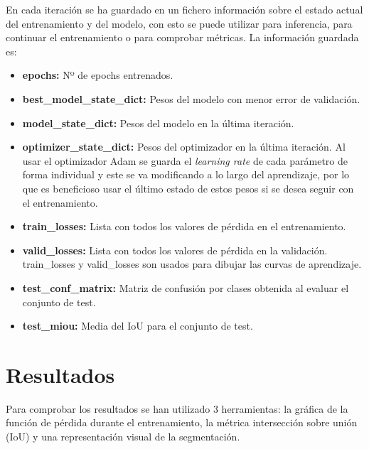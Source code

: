 En cada iteración se ha guardado en un fichero información sobre el estado actual del entrenamiento y del modelo, con esto se puede utilizar para inferencia, para continuar el entrenamiento o para comprobar métricas. La información guardada es:

\begin{itemize}
\item \textbf{epochs:} Nº de epochs entrenados.
\item \textbf{best\_model\_state\_dict:} Pesos del modelo con menor error de validación.
\item \textbf{model\_state\_dict:} Pesos del modelo en la última iteración.
\item \textbf{optimizer\_state\_dict:} Pesos del optimizador en la última iteración. Al usar el optimizador Adam se guarda el \textit{learning rate} de cada parámetro de forma individual y este se va modificando a lo largo del aprendizaje, por lo que es beneficioso usar el último estado de estos pesos si se desea seguir con el entrenamiento.
\item \textbf{train\_losses:} Lista con todos los valores de pérdida en el entrenamiento.
\item \textbf{valid\_losses:} Lista con todos los valores de pérdida en la validación. train\_losses y valid\_losses son usados para dibujar las curvas de aprendizaje.
\item \textbf{test\_conf\_matrix:} Matriz de confusión por clases obtenida al evaluar el conjunto de test.
\item \textbf{test\_miou:} Media del IoU para el conjunto de test.
\end{itemize}

\section{Resultados}\label{sec:initial_system_resultados}

Para comprobar los resultados se han utilizado 3 herramientas: la gráfica de la función de pérdida durante el entrenamiento, la métrica intersección sobre unión (IoU) y una representación visual de la segmentación.


